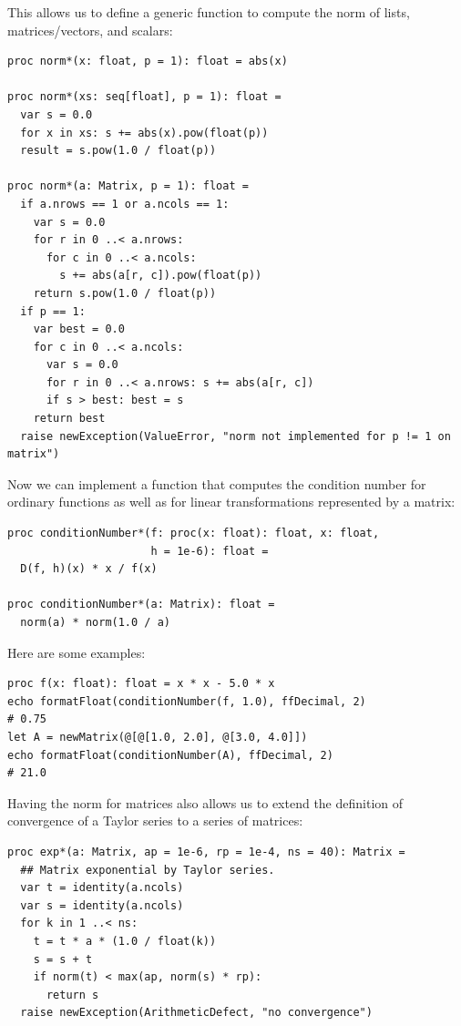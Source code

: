 \documentclass[justified, sixbynine]{tufte-book}
\def\ft{\small\tt}
\theoremstyle{plain}%
\newtheorem * {corollary}{Corollary}
\theoremstyle{definition}
\theoremstyle{remark}
\newtheorem * {remark}{Remark}
\newtheorem * {note}{Note}
\begin{document}
\begin{fullwidth}
This allows us to define a generic function to compute the norm of lists, matrices/vectors, and scalars:

\begin{lstlisting}[caption={in file: {\ft nlib/linalg.nim}}]
proc norm*(x: float, p = 1): float = abs(x)

proc norm*(xs: seq[float], p = 1): float =
  var s = 0.0
  for x in xs: s += abs(x).pow(float(p))
  result = s.pow(1.0 / float(p))

proc norm*(a: Matrix, p = 1): float =
  if a.nrows == 1 or a.ncols == 1:
    var s = 0.0
    for r in 0 ..< a.nrows:
      for c in 0 ..< a.ncols:
        s += abs(a[r, c]).pow(float(p))
    return s.pow(1.0 / float(p))
  if p == 1:
    var best = 0.0
    for c in 0 ..< a.ncols:
      var s = 0.0
      for r in 0 ..< a.nrows: s += abs(a[r, c])
      if s > best: best = s
    return best
  raise newException(ValueError, "norm not implemented for p != 1 on matrix")
\end{lstlisting}

Now we can implement a function that computes the condition number for ordinary functions as well as for linear transformations represented by a matrix:

\begin{lstlisting}[caption={in file: {\ft nlib/linalg.nim}}]
proc conditionNumber*(f: proc(x: float): float, x: float,
                      h = 1e-6): float =
  D(f, h)(x) * x / f(x)

proc conditionNumber*(a: Matrix): float =
  norm(a) * norm(1.0 / a)
\end{lstlisting}

Here are some examples:

\begin{lstlisting}
proc f(x: float): float = x * x - 5.0 * x
echo formatFloat(conditionNumber(f, 1.0), ffDecimal, 2)
# 0.75
let A = newMatrix(@[@[1.0, 2.0], @[3.0, 4.0]])
echo formatFloat(conditionNumber(A), ffDecimal, 2)
# 21.0
\end{lstlisting}


Having the norm for matrices also allows us to extend the definition of convergence of a Taylor series to a series of matrices:

\begin{lstlisting}[caption={in file: {\ft nlib/linalg.nim}}]
proc exp*(a: Matrix, ap = 1e-6, rp = 1e-4, ns = 40): Matrix =
  ## Matrix exponential by Taylor series.
  var t = identity(a.ncols)
  var s = identity(a.ncols)
  for k in 1 ..< ns:
    t = t * a * (1.0 / float(k))
    s = s + t
    if norm(t) < max(ap, norm(s) * rp):
      return s
  raise newException(ArithmeticDefect, "no convergence")
\end{lstlisting}


\end{fullwidth}
\end{document}

